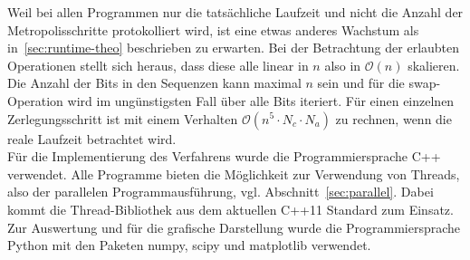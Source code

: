 Weil bei allen Programmen nur die tatsächliche Laufzeit und nicht die Anzahl der Metropolisschritte protokolliert wird, ist eine etwas anderes Wachstum als in~\ref{sec:runtime-theo} beschrieben zu erwarten. Bei der Betrachtung der erlaubten Operationen stellt sich heraus, dass diese alle linear in $n$ also in $\mathcal{O}\left(n\right)$ skalieren. Die Anzahl der Bits in den Sequenzen kann maximal $n$ sein und für die swap-Operation wird im ungünstigsten Fall über alle Bits iteriert. Für einen einzelnen Zerlegungsschritt ist mit einem Verhalten $\mathcal{O}\left(n^5\cdot N_c\cdot N_a\right)$ zu rechnen, wenn die reale Laufzeit betrachtet wird.\\
Für die Implementierung des Verfahrens wurde die Programmiersprache C++ verwendet. Alle Programme bieten die Möglichkeit zur Verwendung von Threads, also der parallelen Programmausführung, vgl. Abschnitt~\ref{sec:parallel}. Dabei kommt die Thread-Bibliothek aus dem aktuellen C++11 Standard zum Einsatz. \\
Zur Auswertung und für die grafische Darstellung wurde die Programmiersprache Python mit den Paketen numpy, scipy und matplotlib verwendet. \\ 




